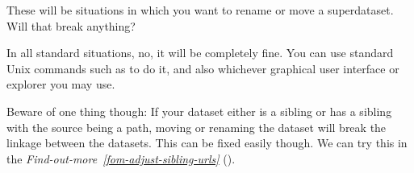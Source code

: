 \sphinxAtStartPar
These will be situations in which you want to rename or move
a superdataset. Will that break anything?

\sphinxAtStartPar
In all standard situations, no, it will be completely fine.
You can use standard Unix commands such as  to do it,
and also whichever graphical user interface or explorer you may
use.

\sphinxAtStartPar
Beware of one thing though: If your dataset either is a sibling
or has a sibling with the source being a path, moving or renaming
the dataset will break the linkage between the datasets. This can
be fixed easily though. We can try this in the \textit{Find-out-more}~{\findoutmoreiconinline}\textit{\ref{fom-adjust-sibling-urls}} {\hyperref[\detokenize{basics/101-136-filesystem:fom-adjust-sibling-urls}]{}} ().


